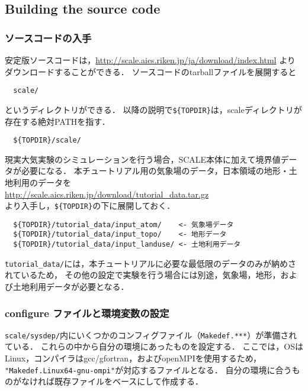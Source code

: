 \subsection{Building the source code} \label{sec:source_code}

\subsubsection{ソースコードの入手}

安定版ソースコードは，\url{http://scale.aics.riken.jp/ja/download/index.html}
よりダウンロードすることができる．
ソースコードのtarballファイルを展開すると
\begin{verbatim}
  scale/
\end{verbatim}
というディレクトリができる．
以降の説明で\verb|${TOPDIR}|は，scaleディレクトリが存在する絶対PATHを指す．
\begin{verbatim}
  ${TOPDIR}/scale/
\end{verbatim}


現実大気実験のシミュレーションを行う場合，SCALE本体に加えて境界値データが必要になる．
本チュートリアル用の気象場のデータ，日本領域の地形・土地利用のデータを\\
 \url{http://scale.aics.riken.jp/download/tutorial_data.tar.gz}\\
より入手し，\verb|${TOPDIR}|の下に展開しておく．
\begin{verbatim}
  ${TOPDIR}/tutorial_data/input_atom/    <- 気象場データ
  ${TOPDIR}/tutorial_data/input_topo/    <- 地形データ
  ${TOPDIR}/tutorial_data/input_landuse/ <- 土地利用データ
\end{verbatim}
\verb|tutorial_data/|には，本チュートリアルに必要な最低限のデータのみが納めされているため，
その他の設定で実験を行う場合には別途，気象場，地形，および土地利用データが必要となる．


\subsubsection{configure ファイルと環境変数の設定}

\verb|scale/sysdep/|内にいくつかのコンフィグファイル（\verb|Makedef.***|）が準備されている．
これらの中から自分の環境にあったものを設定する．
ここでは，OSはLinux，コンパイラはgcc/gfortran，およびopenMPIを使用するため，
\verb|"Makedef.Linux64-gnu-ompi"|が対応するファイルとなる．
自分の環境に合うものがなければ既存ファイルをベースにして作成する．

